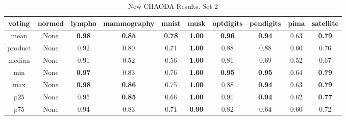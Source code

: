 \begin{table*}[!b]
    \renewcommand{\arraystretch}{1.25}
    \caption{New CHAODA Results. Set 2}
    \label{table:results:new-chaoda-2}
    \centering
    \begin{tabular}{|c|c|c|c|c|c|c|c|c|c|}
        \hline
        \textbf{voting} & \textbf{normed} & \textbf{\textbf{lympho}} & \textbf{\textbf{mammography}} & \textbf{\textbf{mnist}} & \textbf{\textbf{musk}} & \textbf{\textbf{optdigits}} & \textbf{\textbf{pendigits}} & \textbf{\textbf{pima}} & \textbf{\textbf{satellite}} \\
        \hline
                   mean &            None &            \textbf{0.98} &                 \textbf{0.85} &           \textbf{0.78} &          \textbf{1.00} &               \textbf{0.96} &               \textbf{0.94} &                   0.63 &               \textbf{0.79} \\
        \hline
                product &            None &                     0.92 &                          0.80 &                    0.71 &          \textbf{1.00} &                        0.88 &                        0.88 &                   0.60 &                        0.76 \\
        \hline
                 median &            None &                     0.91 &                          0.52 &                    0.56 &          \textbf{1.00} &                        0.81 &                        0.69 &                   0.52 &                        0.67 \\
        \hline
                    min &            None &            \textbf{0.97} &                          0.83 &                    0.76 &          \textbf{1.00} &               \textbf{0.95} &               \textbf{0.95} &                   0.64 &               \textbf{0.79} \\
        \hline
                    max &            None &            \textbf{0.98} &                 \textbf{0.86} &                    0.75 &          \textbf{1.00} &                        0.88 &               \textbf{0.94} &                   0.63 &               \textbf{0.79} \\
        \hline
                    p25 &            None &                     0.95 &                 \textbf{0.85} &                    0.66 &          \textbf{1.00} &                        0.91 &               \textbf{0.94} &                   0.62 &               \textbf{0.77} \\
        \hline
                    p75 &            None &                     0.94 &                          0.83 &                    0.71 &          \textbf{0.99} &                        0.82 &                        0.64 &                   0.60 &                        0.72 \\

\end{tabular}
\end{table*}
